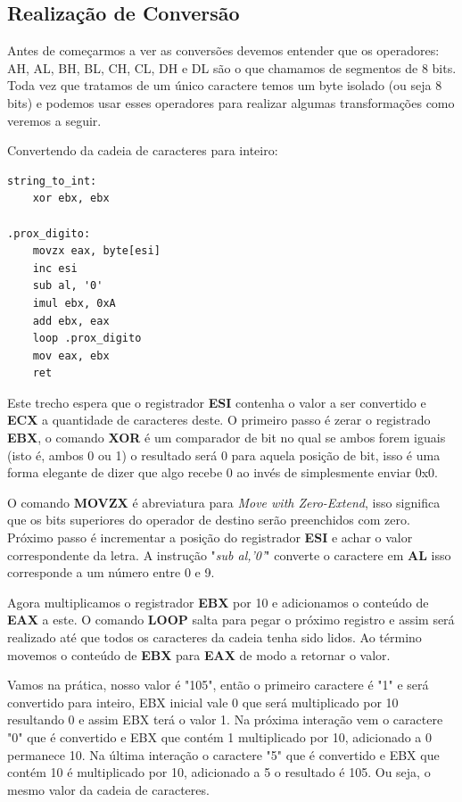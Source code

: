\subsection{Realização de Conversão}

Antes de começarmos a ver as conversões devemos entender que os operadores: AH, AL, BH, BL, CH, CL, DH e DL são o que chamamos de segmentos de 8 bits. Toda vez que tratamos de um único caractere temos um byte isolado (ou seja 8 bits) e podemos usar esses operadores para realizar algumas transformações como veremos a seguir.

Convertendo da cadeia de caracteres para inteiro:
\begin{lstlisting}[]
string_to_int:
	xor ebx, ebx

.prox_digito:
	movzx eax, byte[esi]
	inc esi
	sub al, '0'
	imul ebx, 0xA
	add ebx, eax
	loop .prox_digito
	mov eax, ebx
	ret
\end{lstlisting}

Este trecho espera que o registrador \textbf{ESI} contenha o valor a ser convertido e \textbf{ECX} a quantidade de caracteres deste. O primeiro passo é zerar o registrado \textbf{EBX}, o comando \textbf{XOR} é um comparador de bit no qual se ambos forem iguais (isto é, ambos 0 ou 1) o resultado será 0 para aquela posição de bit, isso é uma forma elegante de dizer que algo recebe 0 ao invés de simplesmente enviar 0x0.

O comando \textbf{MOVZX} é abreviatura para \textit{Move with Zero-Extend}, isso significa que os bits superiores do operador de destino serão preenchidos com zero. Próximo passo é incrementar a posição do registrador \textbf{ESI} e achar o valor correspondente da letra. A instrução "\textit{sub al,'0'}" converte o caractere em \textbf{AL} isso corresponde a um número entre 0 e 9.

Agora multiplicamos o registrador \textbf{EBX} por 10 e adicionamos o conteúdo de \textbf{EAX} a este. O comando \textbf{LOOP} salta para pegar o próximo registro e assim será realizado até que todos os caracteres da cadeia tenha sido lidos. Ao término movemos o conteúdo de \textbf{EBX} para \textbf{EAX} de modo a retornar o valor.

Vamos na prática, nosso valor é "105", então o primeiro caractere é "1" e será convertido para inteiro, EBX inicial vale 0 que será multiplicado por 10 resultando 0 e assim EBX terá o valor 1. Na próxima interação vem o caractere "0" que é convertido e EBX que contém 1 multiplicado por 10, adicionado a 0 permanece 10. Na última interação o caractere "5" que é convertido e EBX que contém 10 é multiplicado por 10, adicionado a 5 o resultado é 105. Ou seja, o mesmo valor da cadeia de caracteres.

